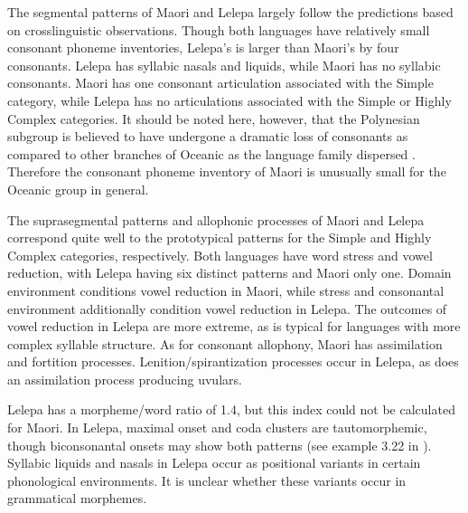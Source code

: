  The segmental patterns of Maori and Lelepa largely follow the predictions based on crosslinguistic observations. Though both languages have relatively small consonant phoneme inventories, Lelepa’s is larger than Maori’s by four consonants. Lelepa has syllabic nasals and liquids, while Maori has no syllabic consonants. Maori has one consonant articulation associated with the Simple category, while Lelepa has no articulations associated with the Simple or Highly Complex categories. It should be noted here, however, that the Polynesian subgroup is believed to have undergone a dramatic loss of consonants as compared to other branches of Oceanic as the language family dispersed \citep{Trudgill2004}. Therefore the consonant phoneme inventory of Maori is unusually small for the Oceanic group in general.



  The suprasegmental patterns and allophonic processes of Maori and Lelepa correspond quite well to the prototypical patterns for the Simple and Highly Complex categories, respectively. Both languages have word stress and vowel reduction, with Lelepa having six distinct patterns and Maori only one. Domain environment conditions vowel reduction in Maori, while stress and consonantal environment additionally condition vowel reduction in Lelepa. The outcomes of vowel reduction in Lelepa are more extreme, as is typical for languages with more complex syllable structure. As for consonant allophony, Maori has assimilation and fortition processes. Lenition/spirantization processes occur in Lelepa, as does an assimilation process producing uvulars.



  Lelepa has a morpheme/word ratio of 1.4, but this index could not be calculated for Maori. In Lelepa, maximal onset and coda clusters are tautomorphemic, though biconsonantal onsets may show both patterns (see example 3.22 in ). Syllabic liquids and nasals in Lelepa occur as positional variants in certain phonological environments. It is unclear whether these variants occur in grammatical morphemes.



